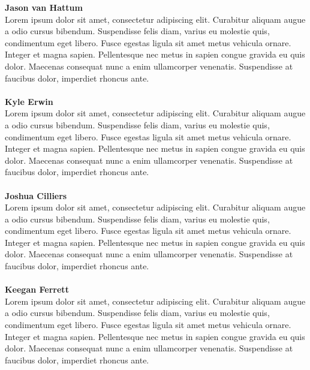 \documentclass[12pt]{article}
\begin{document}
\textbf{Jason van Hattum}\\ 
Lorem ipsum dolor sit amet, consectetur adipiscing elit. Curabitur aliquam augue a odio cursus bibendum. Suspendisse felis diam, varius eu molestie quis, condimentum eget libero. Fusce egestas ligula sit amet metus vehicula ornare. Integer et magna sapien. Pellentesque nec metus in sapien congue gravida eu quis dolor. Maecenas consequat nunc a enim ullamcorper venenatis. Suspendisse at faucibus dolor, imperdiet rhoncus ante.\\ \\
\textbf{Kyle Erwin}\\
Lorem ipsum dolor sit amet, consectetur adipiscing elit. Curabitur aliquam augue a odio cursus bibendum. Suspendisse felis diam, varius eu molestie quis, condimentum eget libero. Fusce egestas ligula sit amet metus vehicula ornare. Integer et magna sapien. Pellentesque nec metus in sapien congue gravida eu quis dolor. Maecenas consequat nunc a enim ullamcorper venenatis. Suspendisse at faucibus dolor, imperdiet rhoncus ante.\\ \\
\textbf{Joshua Cilliers}\\
Lorem ipsum dolor sit amet, consectetur adipiscing elit. Curabitur aliquam augue a odio cursus bibendum. Suspendisse felis diam, varius eu molestie quis, condimentum eget libero. Fusce egestas ligula sit amet metus vehicula ornare. Integer et magna sapien. Pellentesque nec metus in sapien congue gravida eu quis dolor. Maecenas consequat nunc a enim ullamcorper venenatis. Suspendisse at faucibus dolor, imperdiet rhoncus ante. \\ \\
\textbf{Keegan Ferrett}\\
Lorem ipsum dolor sit amet, consectetur adipiscing elit. Curabitur aliquam augue a odio cursus bibendum. Suspendisse felis diam, varius eu molestie quis, condimentum eget libero. Fusce egestas ligula sit amet metus vehicula ornare. Integer et magna sapien. Pellentesque nec metus in sapien congue gravida eu quis dolor. Maecenas consequat nunc a enim ullamcorper venenatis. Suspendisse at faucibus dolor, imperdiet rhoncus ante.
\end{document}
